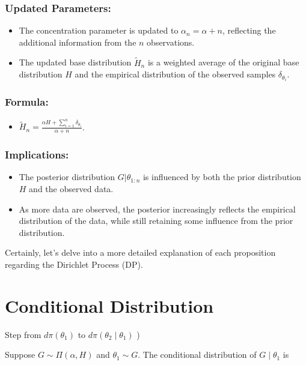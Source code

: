 \documentclass[10pt]{article}
\begin{document}
\subsubsection*{Updated Parameters:}
\begin{itemize}
  \item The concentration parameter is updated to \( \alpha_n = \alpha + n \), reflecting the additional information from the \( n \) observations.
  \item The updated base distribution \( \tilde{H}_n \) is a weighted average of the original base distribution \( H \) and the empirical distribution of the observed samples \( \delta_{\theta_i} \).
\end{itemize}

\subsubsection*{Formula:}
\begin{itemize}
  \item \( \tilde{H}_n = \frac{\alpha H + \sum_{i=1}^n \delta_{\theta_i}}{\alpha + n} \).
\end{itemize}

\subsubsection*{Implications:}
\begin{itemize}
  \item The posterior distribution \( G|\theta_{1:n} \) is influenced by both the prior distribution \( H \) and the observed data.
  \item As more data are observed, the posterior increasingly reflects the empirical distribution of the data, while still retaining some influence from the prior distribution.
\end{itemize}

Certainly, let's delve into a more detailed explanation of each proposition regarding the Dirichlet Process (DP).

\section*{Conditional Distribution}
Step from $d \pi\left(\theta_1\right)$ to $d \pi\left(\theta_2 \mid \theta_1\right)$ )

Suppose $G \sim \Pi(\alpha, H)$ and $\theta_1 \sim G$. The conditional distribution of $G \mid \theta_1$ is
\end{document}
